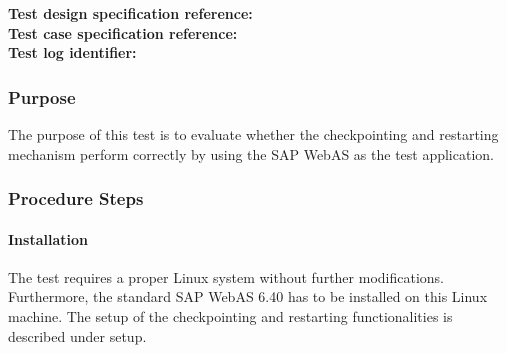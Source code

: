 

\noindent\textbf{Test design specification reference: }\\
\noindent\textbf{Test case specification reference: }\\
\noindent\textbf{Test log identifier: }




\subsubsection{Purpose}
The purpose of this test is to evaluate whether the checkpointing and restarting mechanism perform correctly by using the SAP WebAS as the test application.

\subsubsection{Procedure Steps}

\paragraph{Installation}
The test requires a proper Linux system without further modifications. Furthermore, the standard SAP WebAS 6.40 has to be installed on this Linux machine. The setup of the checkpointing and restarting functionalities is described under setup.

